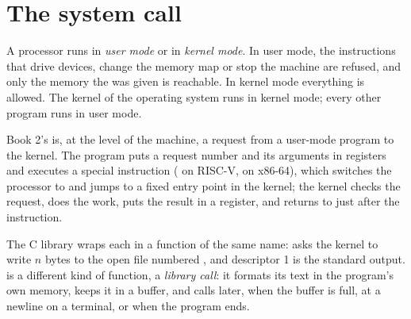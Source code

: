 \section{The system call}\label{sec:b2:processes-and-system-calls:syscall}

\begin{definition}\label{def:b2:processes-and-system-calls:modes}
A processor runs in \emph{user mode} or in \emph{kernel mode}. In user mode, the
instructions that drive devices, change the memory map or stop the machine are refused, and only the memory the
 was given is reachable. In kernel mode everything is allowed. The kernel of the operating system runs in
kernel mode; every other program runs in user mode.
\end{definition}

\begin{remark}\label{def:b2:processes-and-system-calls:syscall}
Book 2's  is, at the level of the machine, a request from a user-mode program to the kernel. The program puts a
request number and its arguments in registers and executes a special instruction ( on RISC-V,
 on x86-64), which switches the processor to  and jumps to a fixed entry point in the kernel;
the kernel checks the request, does the work, puts the result in a register, and returns to  just after the
instruction.
\end{remark}

The C library wraps each  in a function of the same name:  asks the kernel to
write $n$ bytes to the open file numbered , and descriptor 1 is the standard output.  is a
different kind of function, a \emph{library call}: it formats its text in the program's own memory, keeps it in a
buffer, and calls  later, when the buffer is full, at a newline on a terminal, or when the program ends.


\label{out:b2:processes-and-system-calls:strace}

